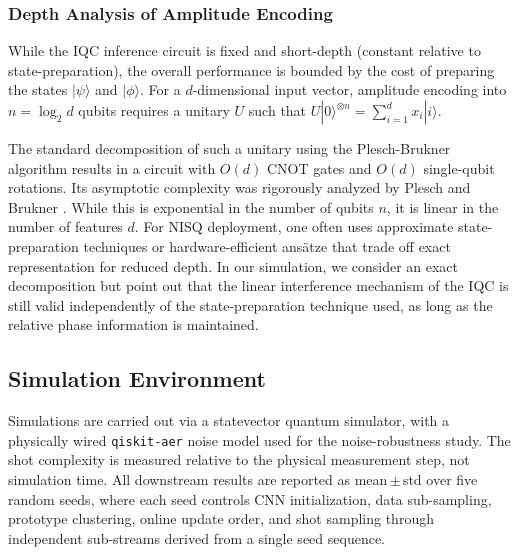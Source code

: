 \documentclass[conference]{IEEEtran}
\begin{document}
\subsubsection{Depth Analysis of Amplitude Encoding}
While the IQC inference circuit is fixed and short-depth (constant relative to state-preparation), the overall performance is bounded by the cost of preparing the states $|\psi\rangle$ and $|\phi\rangle$. For a $d$-dimensional input vector, amplitude encoding into $n = \log_2 d$ qubits requires a unitary $U$ such that $U|0\rangle^{\otimes n} = \sum_{i=1}^d x_i |i\rangle$.

The standard decomposition of such a unitary using the Plesch-Brukner algorithm results in a circuit with $O(d)$ CNOT gates and $O(d)$ single-qubit rotations. Its asymptotic complexity was rigorously analyzed by Plesch and Brukner \cite{plesch2011quantum}. While this is exponential in the number of qubits $n$, it is linear in the number of features $d$. For NISQ deployment, one often uses approximate state-preparation techniques or hardware-efficient ans\"atze that trade off exact representation for reduced depth. In our simulation, we consider an exact decomposition but point out that the linear interference mechanism of the IQC is still valid independently of the state-preparation technique used, as long as the relative phase information is maintained.

\subsection{Simulation Environment}
Simulations are carried out via a statevector quantum simulator, with a physically wired \texttt{qiskit-aer} noise model used for the noise-robustness study. The shot complexity is measured relative to the physical measurement step, not simulation time. All downstream results are reported as mean\,$\pm$\,std over five random seeds, where each seed controls CNN initialization, data sub-sampling, prototype clustering, online update order, and shot sampling through independent sub-streams derived from a single seed sequence.
\end{document}
